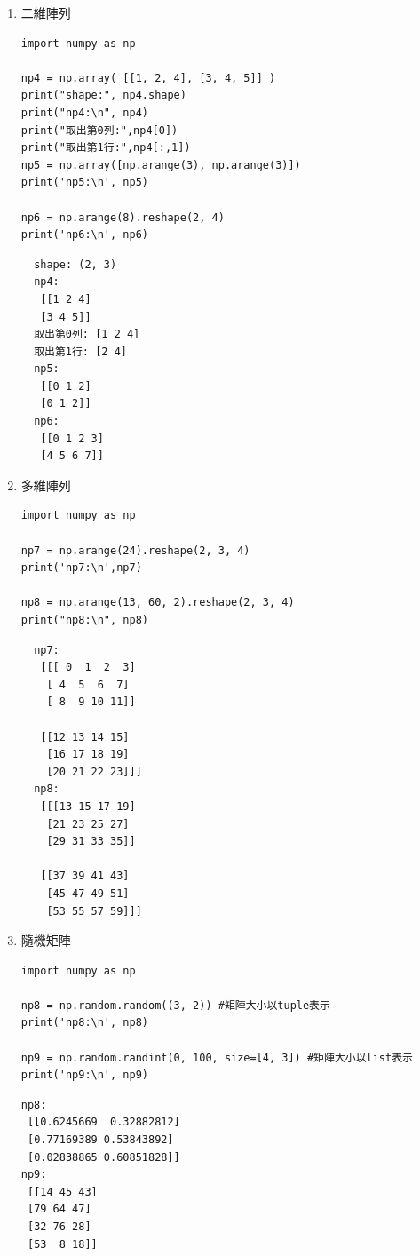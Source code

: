 \documentclass[a4paper,12pt]{article}
\begin{document}
\begin{enumerate}
\item 二維陣列
\label{sec:org516a7b9}
\lstset{breaklines=true,language=Python,label= ,caption= ,captionpos=b,firstnumber=1,numbers=left}
\begin{lstlisting}
import numpy as np

np4 = np.array( [[1, 2, 4], [3, 4, 5]] )
print("shape:", np4.shape)
print("np4:\n", np4)
print("取出第0列:",np4[0])
print("取出第1行:",np4[:,1])
np5 = np.array([np.arange(3), np.arange(3)])
print('np5:\n', np5)

np6 = np.arange(8).reshape(2, 4)
print('np6:\n', np6)
\end{lstlisting}

\begin{verbatim}
  shape: (2, 3)
  np4:
   [[1 2 4]
   [3 4 5]]
  取出第0列: [1 2 4]
  取出第1行: [2 4]
  np5:
   [[0 1 2]
   [0 1 2]]
  np6:
   [[0 1 2 3]
   [4 5 6 7]]
\end{verbatim}
\item 多維陣列
\label{sec:orgbf35092}
\lstset{breaklines=true,language=Python,label= ,caption= ,captionpos=b,firstnumber=1,numbers=left}
\begin{lstlisting}
import numpy as np

np7 = np.arange(24).reshape(2, 3, 4)
print('np7:\n',np7)

np8 = np.arange(13, 60, 2).reshape(2, 3, 4)
print("np8:\n", np8)
\end{lstlisting}

\begin{verbatim}
  np7:
   [[[ 0  1  2  3]
    [ 4  5  6  7]
    [ 8  9 10 11]]

   [[12 13 14 15]
    [16 17 18 19]
    [20 21 22 23]]]
  np8:
   [[[13 15 17 19]
    [21 23 25 27]
    [29 31 33 35]]

   [[37 39 41 43]
    [45 47 49 51]
    [53 55 57 59]]]
\end{verbatim}
\item 隨機矩陣
\label{sec:orga9683b2}
\lstset{breaklines=true,language=Python,label= ,caption= ,captionpos=b,firstnumber=1,numbers=left}
\begin{lstlisting}
import numpy as np

np8 = np.random.random((3, 2)) #矩陣大小以tuple表示
print('np8:\n', np8)

np9 = np.random.randint(0, 100, size=[4, 3]) #矩陣大小以list表示
print('np9:\n', np9)
\end{lstlisting}

\begin{verbatim}
np8:
 [[0.6245669  0.32882812]
 [0.77169389 0.53843892]
 [0.02838865 0.60851828]]
np9:
 [[14 45 43]
 [79 64 47]
 [32 76 28]
 [53  8 18]]
\end{verbatim}



\end{enumerate}
\end{document}
